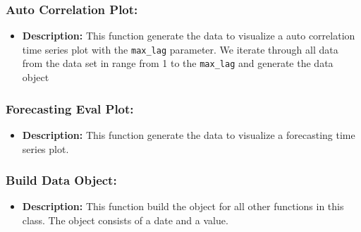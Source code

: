 \documentclass[11pt, a4paper]{article}
\begin{document}
\subsubsection*{Auto Correlation Plot:}
\begin{itemize}
 \item[] \textbf{Description:} This function generate the data to visualize a auto correlation time series plot with the \texttt{max\_lag} parameter.
 We iterate through all data from the data set in range from 1 to the \texttt{max\_lag} and generate the data object
\end{itemize}


\subsubsection*{Forecasting Eval Plot:}
\begin{itemize}
 \item[] \textbf{Description:} This function generate the data to visualize a forecasting time series plot.
\end{itemize}


\subsubsection*{Build Data Object:}
\begin{itemize}
 \item[] \textbf{Description:} This function build the object for all other functions in this class. The object consists of a date and a value.
\end{itemize}
\end{document}
